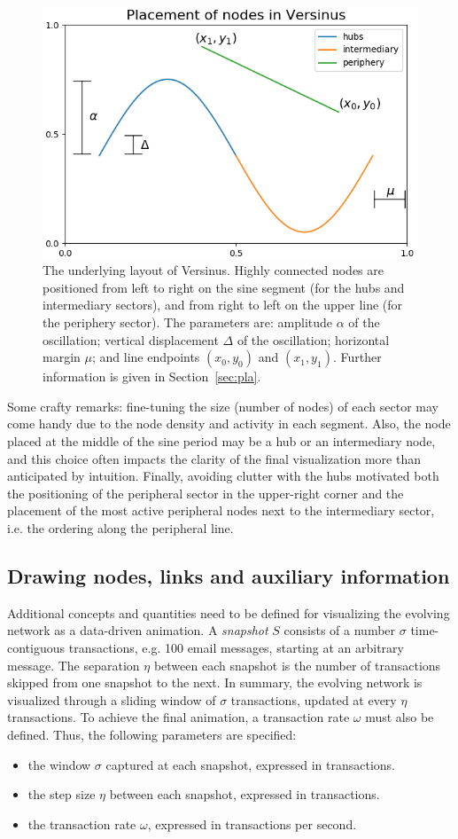 \documentclass[runningheads]{llncs}
\begin{document}
\begin{figure}[!h]\centering
\includegraphics[width=.7\textwidth]{nodePositioning}
  \caption{The underlying layout of Versinus. Highly connected nodes are positioned from left to right on the sine segment (for the hubs and intermediary sectors), and from right to left on the upper line (for the periphery sector). The parameters are: amplitude $\alpha$ of the oscillation; vertical displacement $\Delta$ of the oscillation; horizontal margin $\mu$; and line endpoints $(x_0, y_0)$ and $(x_1, y_1)$.
   Further information is given in Section~\ref{sec:pla}.
  }\label{fig:glob}
\end{figure}

\noindent Some crafty remarks: fine-tuning the size (number of nodes) of each sector may come handy due to the node density and activity in each segment. Also, the node placed at the middle of the sine period may be a hub or an intermediary node, and this choice often impacts the clarity of the final visualization more than anticipated by intuition.
Finally, avoiding clutter with the hubs motivated both 
the positioning of the peripheral sector in the upper-right corner and
the placement of the most active peripheral nodes next to the intermediary sector, i.e. the ordering along the peripheral line.

\subsection{Drawing nodes, links and auxiliary information}
Additional concepts and quantities need to be defined for visualizing the evolving network as a data-driven animation.
A \emph{snapshot} $S$ consists of a number $\sigma$ time-contiguous transactions, e.g. 100 email messages, starting at an arbitrary message.
The separation $\eta$ between each snapshot is the number of transactions skipped from one snapshot to the next.
In summary, the evolving network is visualized through a sliding window of $\sigma$ transactions, updated at every $\eta$ transactions. To achieve the final animation, a transaction rate $\omega$ must also be defined.
Thus, the following parameters are specified:
\begin{itemize}
  \item the window $\sigma$ captured at each snapshot, expressed in transactions.
  \item the step size $\eta$ between each snapshot, expressed in transactions.
  \item the transaction rate $\omega$, expressed in transactions per second.
\end{itemize}
\end{document}
